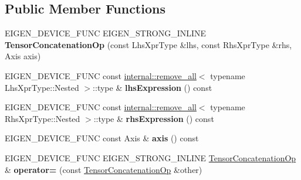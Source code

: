\subsection*{Public Member Functions}
\begin{DoxyCompactItemize}
\item 
\mbox{\label{class_eigen_1_1_tensor_concatenation_op_a5cc21137208c46e256726330bbc534cb}} 
E\+I\+G\+E\+N\+\_\+\+D\+E\+V\+I\+C\+E\+\_\+\+F\+U\+NC E\+I\+G\+E\+N\+\_\+\+S\+T\+R\+O\+N\+G\+\_\+\+I\+N\+L\+I\+NE {\bfseries Tensor\+Concatenation\+Op} (const Lhs\+Xpr\+Type \&lhs, const Rhs\+Xpr\+Type \&rhs, Axis axis)
\item 
\mbox{\label{class_eigen_1_1_tensor_concatenation_op_afba25c364c44056d16b52470b273098a}} 
E\+I\+G\+E\+N\+\_\+\+D\+E\+V\+I\+C\+E\+\_\+\+F\+U\+NC const \hyperlink{struct_eigen_1_1internal_1_1remove__all}{internal\+::remove\+\_\+all}$<$ typename Lhs\+Xpr\+Type\+::\+Nested $>$\+::type \& {\bfseries lhs\+Expression} () const
\item 
\mbox{\label{class_eigen_1_1_tensor_concatenation_op_ae500a14d17e34549a3164df6f0eb7038}} 
E\+I\+G\+E\+N\+\_\+\+D\+E\+V\+I\+C\+E\+\_\+\+F\+U\+NC const \hyperlink{struct_eigen_1_1internal_1_1remove__all}{internal\+::remove\+\_\+all}$<$ typename Rhs\+Xpr\+Type\+::\+Nested $>$\+::type \& {\bfseries rhs\+Expression} () const
\item 
\mbox{\label{class_eigen_1_1_tensor_concatenation_op_a09ce4fcc4a385d0bc59cf4172f96dcbe}} 
E\+I\+G\+E\+N\+\_\+\+D\+E\+V\+I\+C\+E\+\_\+\+F\+U\+NC const Axis \& {\bfseries axis} () const
\item 
\mbox{\label{class_eigen_1_1_tensor_concatenation_op_a710e8f1a467787ede3f88ace80eff45a}} 
E\+I\+G\+E\+N\+\_\+\+D\+E\+V\+I\+C\+E\+\_\+\+F\+U\+NC E\+I\+G\+E\+N\+\_\+\+S\+T\+R\+O\+N\+G\+\_\+\+I\+N\+L\+I\+NE \hyperlink{class_eigen_1_1_tensor_concatenation_op}{Tensor\+Concatenation\+Op} \& {\bfseries operator=} (const \hyperlink{class_eigen_1_1_tensor_concatenation_op}{Tensor\+Concatenation\+Op} \&other)
\item 
\mbox{\label{class_eigen_1_1_tensor_concatenation_op_a6abf89d1db219401bd0929105bb707c3}} 

\end{DoxyCompactItemize}
